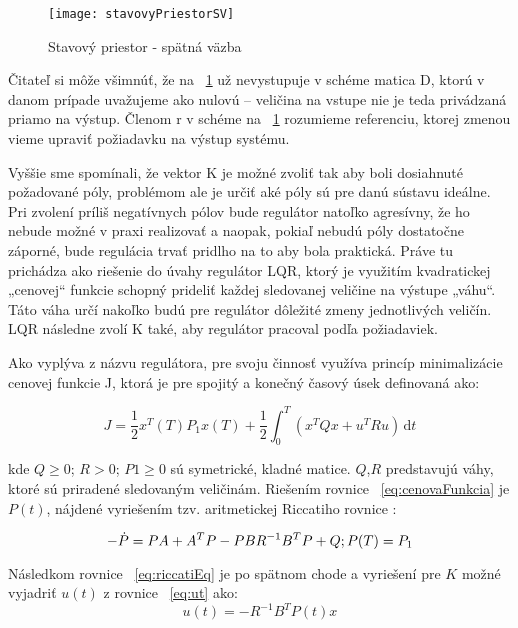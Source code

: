 \begin{figure}
\centering
\texttt{[image: stavovyPriestorSV]}
\caption{Stavový priestor - spätná väzba}
\label{fig:stavovyPriestorSV}
\end{figure}

Čitateľ si môže všimnúť, že na \figurename~\ref{fig:stavovyPriestorSV} už nevystupuje v schéme matica D, ktorú v danom prípade uvažujeme ako nulovú – veličina na vstupe nie je teda privádzaná priamo na výstup. Členom r v schéme na \figurename~\ref{fig:stavovyPriestorSV} rozumieme referenciu, ktorej zmenou vieme upraviť požiadavku na výstup systému.

Vyššie sme spomínali, že vektor K je možné zvoliť tak aby boli dosiahnuté požadované póly, problémom ale je určiť aké póly sú pre danú sústavu ideálne. Pri zvolení príliš negatívnych pólov bude regulátor natoľko agresívny, že ho nebude možné v praxi realizovať a naopak, pokiaľ nebudú póly dostatočne záporné, bude regulácia trvať pridlho na to aby bola praktická.  Práve tu prichádza ako riešenie do úvahy regulátor LQR, ktorý je využitím kvadratickej „cenovej“ funkcie schopný prideliť každej sledovanej veličine na výstupe „váhu“. Táto váha určí nakoľko budú pre regulátor dôležité zmeny jednotlivých veličín. LQR následne zvolí K také, aby regulátor pracoval podľa požiadaviek.

Ako vyplýva z názvu regulátora, pre svoju činnosť využíva princíp minimalizácie cenovej funkcie J, ktorá je pre spojitý a konečný časový úsek definovaná ako:

\begin{equation}
J = \dfrac {1} {2} x^T (T)P_1 x(T)  + \dfrac {1} {2} \int_0^T \! ( x^T Qx + u^T Ru) \, \mathrm{d}t 
\label{eq:cenovaFunkcia}
\end{equation}

kde $Q \geq 0$; $R > 0$; $P1 \geq 0$ sú symetrické, kladné matice. $Q$,$ R$ predstavujú váhy, ktoré sú priradené sledovaným veličinám.
Riešením rovnice \figurename~\ref{eq:cenovaFunkcia} je $P(t)$, nájdené vyriešením tzv. aritmetickej Riccatiho rovnice :

\begin{equation}
- \dot {P} = PA + A^T P - PBR^{-1} B^T P + Q;	\\
P( T ) = P_1
\label{eq:riccatiEq}
\end{equation}

Následkom rovnice \figurename~\ref{eq:riccatiEq} je po spätnom chode a vyriešení pre $K$ možné vyjadriť $u(t)$ z rovnice \figurename~\ref{eq:ut} ako:
\begin{equation}
u( t ) = -R^{-1} B^T P( t )x
\end{equation}

